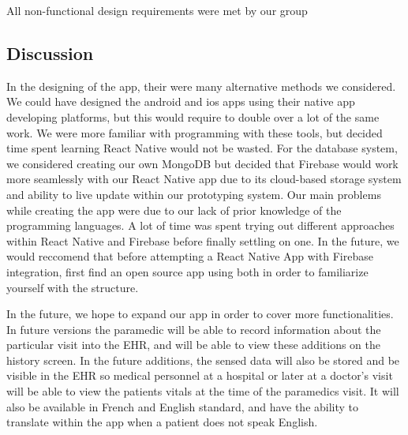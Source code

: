 All non-functional design requirements were met by our group

\subsection{Discussion}
In the designing of the app, their were many alternative methods we considered. We could have designed the android and ios apps using their native app developing platforms, but this would require to double over a lot of the same work. We were more familiar with programming with these tools, but decided time spent learning React Native would not be wasted. For the database system, we considered creating our own MongoDB but decided that Firebase would work more seamlessly with our React Native app due to its cloud-based storage system and ability to live update within our prototyping system.
Our main problems while creating the app were due to our lack of prior knowledge of the programming languages. A lot of time was spent trying out different approaches within React Native and Firebase before finally settling on one. In the future, we would reccomend that before attempting a React Native App with Firebase integration, first find an open source app using both in order to familiarize yourself with the structure.

In the future, we hope to expand our app in order to cover more functionalities. In future versions the paramedic will be able to record information about the particular visit into the EHR, and will be able to view these additions on the history screen. In the future additions, the sensed data will also be stored and be visible in the EHR so medical personnel at a hospital or later at a doctor's visit will be able to view the patients vitals at the time of the paramedics visit. It will also be available in French and English standard, and have the ability to translate within the app when a patient does not speak English. 
